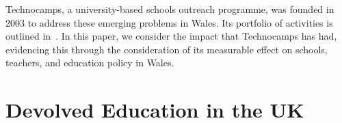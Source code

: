 \documentclass[conference]{IEEEtran}
\begin{document}

Technocamps, a university-based schools outreach programme,
was founded in 2003 to address these emerging problems in Wales.
Its portfolio of activities is outlined in~\cite{crick+moller-wipsce2015}.
In this paper, we consider the impact that Technocamps has had,
evidencing this through the consideration of its measurable
effect on schools, teachers, and education policy in Wales.

\section{Devolved Education in the UK}\label{welshukedu}

\end{document}
